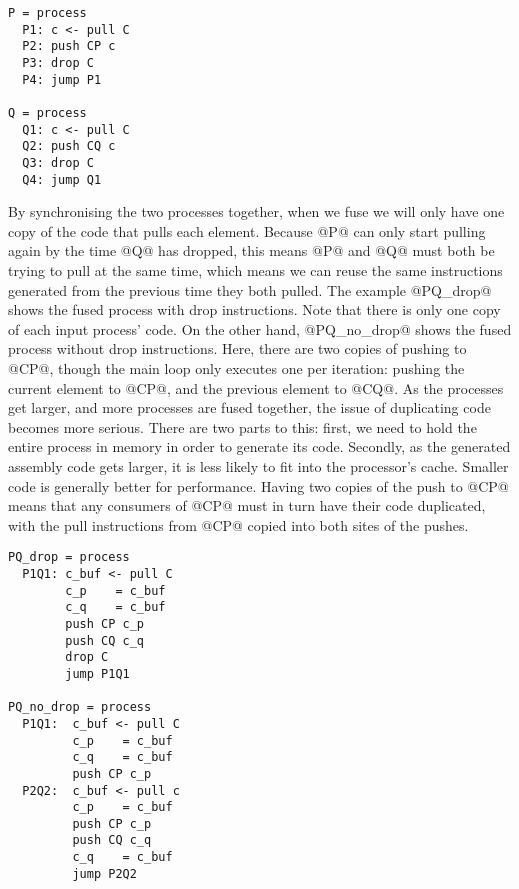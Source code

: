 \begin{lstlisting}
P = process
  P1: c <- pull C
  P2: push CP c
  P3: drop C
  P4: jump P1

Q = process
  Q1: c <- pull C
  Q2: push CQ c
  Q3: drop C
  Q4: jump Q1
\end{lstlisting}

By synchronising the two processes together, when we fuse we will only have one copy of the code that pulls each element.
Because @P@ can only start pulling again by the time @Q@ has dropped, this means @P@ and @Q@ must both be trying to pull at the same time, which means we can reuse the same instructions generated from the previous time they both pulled.
The example @PQ_drop@ shows the fused process with drop instructions.
Note that there is only one copy of each input process' code.
On the other hand, @PQ_no_drop@ shows the fused process without drop instructions.
Here, there are two copies of pushing to @CP@, though the main loop only executes one per iteration: pushing the current element to @CP@, and the previous element to @CQ@.
As the processes get larger, and more processes are fused together, the issue of duplicating code becomes more serious.
There are two parts to this: first, we need to hold the entire process in memory in order to generate its code.
Secondly, as the generated assembly code gets larger, it is less likely to fit into the processor's cache.
Smaller code is generally better for performance.
Having two copies of the push to @CP@ means that any consumers of @CP@ must in turn have their code duplicated, with the pull instructions from @CP@ copied into both sites of the pushes.

\begin{lstlisting}
PQ_drop = process
  P1Q1: c_buf <- pull C
        c_p    = c_buf
        c_q    = c_buf
        push CP c_p
        push CQ c_q
        drop C
        jump P1Q1

PQ_no_drop = process
  P1Q1:  c_buf <- pull C
         c_p    = c_buf
         c_q    = c_buf
         push CP c_p
  P2Q2:  c_buf <- pull c
         c_p    = c_buf
         push CP c_p
         push CQ c_q
         c_q    = c_buf
         jump P2Q2
\end{lstlisting}



